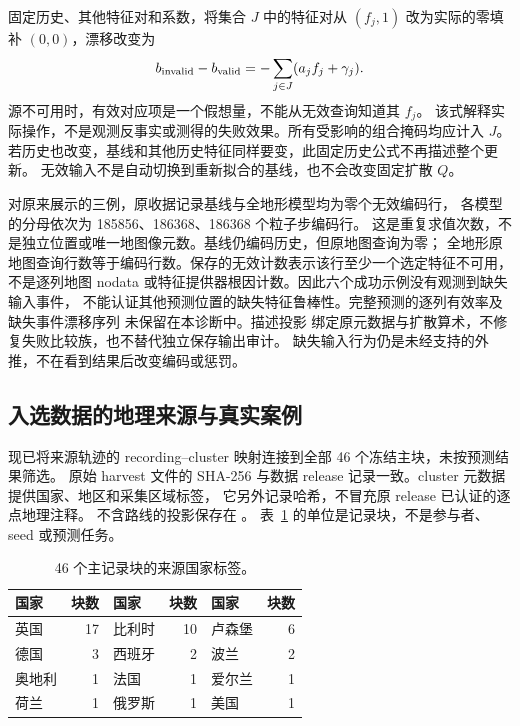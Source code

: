 \documentclass[UTF8,11pt]{ctexart}
\begin{document}
固定历史、其他特征对和系数，将集合 \(J\) 中的特征对从 \((f_j,1)\)
改为实际的零填补 \((0,0)\)，漂移改变为
\begin{equation}
b_{\rm invalid}-b_{\rm valid}=-\sum_{j\in J}(a_jf_j+\gamma_j).
\label{eq:missing-drift-change}
\end{equation}
源不可用时，有效对应项是一个假想量，不能从无效查询知道其 \(f_j\)。
该式解释实际操作，不是观测反事实或测得的失败效果。所有受影响的组合掩码均应计入 \(J\)。
若历史也改变，基线和其他历史特征同样要变，此固定历史公式不再描述整个更新。
无效输入不是自动切换到重新拟合的基线，也不会改变固定扩散 \(Q\)。

对原来展示的三例，原收据记录基线与全地形模型均为零个无效编码行，
各模型的分母依次为 185856、186368、186368 个粒子步编码行。
这是重复求值次数，不是独立位置或唯一地图像元数。基线仍编码历史，但原地图查询为零；
全地形原地图查询行数等于编码行数。保存的无效计数表示该行至少一个选定特征不可用，
不是逐列地图 nodata 或特征提供器根因计数。因此六个成功示例没有观测到缺失输入事件，
不能认证其他预测位置的缺失特征鲁棒性。完整预测的逐列有效率及缺失事件漂移序列
未保留在本诊断中。描述投影
绑定原元数据与扩散算术，不修复失败比较族，也不替代独立保存输出审计。
缺失输入行为仍是未经支持的外推，不在看到结果后改变编码或惩罚。

\subsection{入选数据的地理来源与真实案例}
现已将来源轨迹的 recording--cluster 映射连接到全部 46 个冻结主块，未按预测结果筛选。
原始 harvest 文件的 SHA-256 与数据 release 记录一致。cluster 元数据提供国家、地区和采集区域标签，
它另外记录哈希，不冒充原 release 已认证的逐点地理注释。
不含路线的投影保存在 。
表~\ref{tab:geographic-blocks} 的单位是记录块，不是参与者、seed 或预测任务。

\begin{table}[htbp]
\centering\small
\caption{46 个主记录块的来源国家标签。}
\label{tab:geographic-blocks}
\begin{tabular}{lr lr lr}
\toprule
国家 & 块数 & 国家 & 块数 & 国家 & 块数\\
\midrule
英国 & 17 & 比利时 & 10 & 卢森堡 & 6\\
德国 & 3 & 西班牙 & 2 & 波兰 & 2\\
奥地利 & 1 & 法国 & 1 & 爱尔兰 & 1\\
荷兰 & 1 & 俄罗斯 & 1 & 美国 & 1\\
\bottomrule
\end{tabular}
\end{table}
\end{document}
